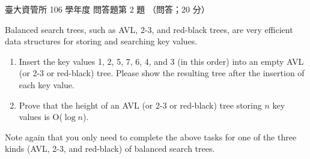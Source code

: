 \begin{pastexam}[label={px:ntu-106-im-it-02}]{臺大資管所 106 學年度 問答題第 2 題}
（問答；20 分）

Balanced search trees, such as AVL, 2-3, and red-black trees, are very efficient data structures for
storing and searching key values.
\begin{enumerate}[label=(\alph*)]
\item Insert the key values 1, 2, 5, 7, 6, 4, and 3 (in this order) into an empty AVL (or 2-3 or
red-black) tree. Please show the resulting tree after the insertion of each key value.
\item Prove that the height of an AVL (or 2-3 or red-black) tree storing $n$ key values is
O($\log n$).
\end{enumerate}
Note again that you only need to complete the above tasks for one of the three kinds (AVL, 2-3, and
red-black) of balanced search trees.
\end{pastexam}

